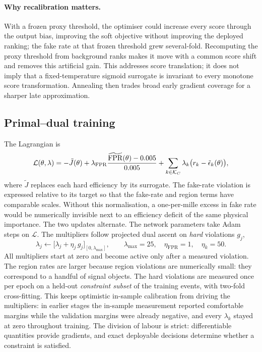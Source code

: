 \paragraph{Why recalibration matters.}
With a frozen proxy threshold, the optimiser could increase every score through the output bias, improving the soft objective without improving the deployed ranking; the fake rate at that frozen threshold grew several-fold. Recomputing the proxy threshold from background ranks makes it move with a common score shift and removes this artificial gain. This addresses score translation; it does not imply that a fixed-temperature sigmoid surrogate is invariant to every monotone score transformation. Annealing then trades broad early gradient coverage for a sharper late approximation.

\subsection{Primal--dual training}
The Lagrangian is
\begin{equation}
  \mathcal{L}(\theta,\lambda)=-\tilde J(\theta)+\lambda_{\mathrm{FPR}}\frac{\widetilde{\mathrm{FPR}}(\theta)-0.005}{0.005}+\sum_{k\in\mathcal{K}_C}\lambda_k\big(r_k-\tilde{\epsilon}_k(\theta)\big),
\end{equation}
where $\tilde J$ replaces each hard efficiency by its surrogate. The fake-rate violation is expressed relative to its target so that the fake-rate and region terms have comparable scales. Without this normalisation, a one-per-mille excess in fake rate would be numerically invisible next to an efficiency deficit of the same physical importance. The two updates alternate. The network parameters take Adam steps on $\mathcal{L}$. The multipliers follow projected dual ascent on \emph{hard} violations $g_j$,
\begin{equation}
  \lambda_j\leftarrow\big[\lambda_j+\eta_j\,g_j\big]_{[0,\lambda_{\max}]},\qquad\lambda_{\max}=25,\quad\eta_{\mathrm{FPR}}=1,\quad\eta_k=50 .
\end{equation}
All multipliers start at zero and become active only after a measured violation. The region rates are larger because region violations are numerically small: they correspond to a handful of signal objects. The hard violations are measured once per epoch on a held-out \emph{constraint subset} of the training events, with two-fold cross-fitting. This keeps optimistic in-sample calibration from driving the multipliers: in earlier stages the in-sample measurement reported comfortable margins while the validation margins were already negative, and every $\lambda_k$ stayed at zero throughout training. The division of labour is strict: differentiable quantities provide gradients, and exact deployable decisions determine whether a constraint is satisfied.

